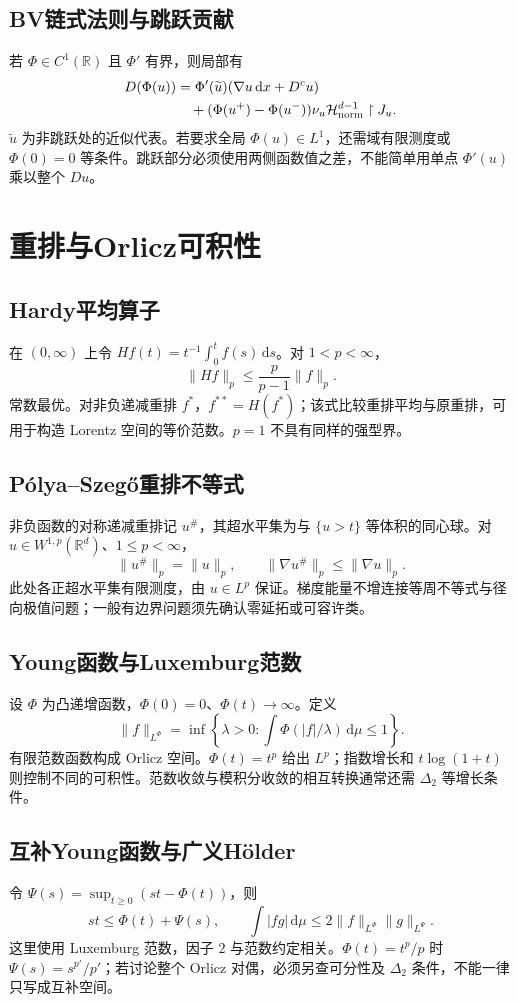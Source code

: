 \documentclass[../main.tex]{subfiles}
\begin{document}
\subsection{BV链式法则与跳跃贡献}
若 $\Phi\in C^1(\mathbb R)$ 且 $\Phi'$ 有界，则局部有
\begin{align*}
D(\Phi(u))&=\Phi'(\widetilde u)(\nabla u\,\mathrm dx+D^cu)\\
&\quad+(\Phi(u^+)-\Phi(u^-))\nu_u\mathcal H^{d-1}_{\rm norm}\restriction J_u.
\end{align*}
$\widetilde u$ 为非跳跃处的近似代表。若要求全局 $\Phi(u)\in L^1$，还需域有限测度或 $\Phi(0)=0$ 等条件。跳跃部分必须使用两侧函数值之差，不能简单用单点 $\Phi'(u)$ 乘以整个 $Du$。
\section{重排与Orlicz可积性}
\subsection{Hardy平均算子}
在 $(0,\infty)$ 上令 $Hf(t)=t^{-1}\int_0^tf(s)\,\mathrm ds$。对 $1<p<\infty$，
\[
\|Hf\|_p\le\frac p{p-1}\|f\|_p.
\]
常数最优。对非负递减重排 $f^*$，$f^{**}=H(f^*)$；该式比较重排平均与原重排，可用于构造 Lorentz 空间的等价范数。$p=1$ 不具有同样的强型界。
\subsection{Pólya--Szegő重排不等式}
非负函数的对称递减重排记 $u^\#$，其超水平集为与 $\{u>t\}$ 等体积的同心球。对 $u\in W^{1,p}(\mathbb R^d)$、$1\le p<\infty$，
\[
\|u^\#\|_p=\|u\|_p,\qquad\|\nabla u^\#\|_p\le\|\nabla u\|_p.
\]
此处各正超水平集有限测度，由 $u\in L^p$ 保证。梯度能量不增连接等周不等式与径向极值问题；一般有边界问题须先确认零延拓或可容许类。
\subsection{Young函数与Luxemburg范数}
设 $\Phi$ 为凸递增函数，$\Phi(0)=0$、$\Phi(t)\to\infty$。定义
\[
\|f\|_{L^\Phi}=\inf\left\{\lambda>0:\int\Phi(|f|/\lambda)\,\mathrm d\mu\le1\right\}.
\]
有限范数函数构成 Orlicz 空间。$\Phi(t)=t^p$ 给出 $L^p$；指数增长和 $t\log(1+t)$ 则控制不同的可积性。范数收敛与模积分收敛的相互转换通常还需 $\Delta_2$ 等增长条件。
\subsection{互补Young函数与广义Hölder}
令 $\Psi(s)=\sup_{t\ge0}(st-\Phi(t))$，则
\[
st\le\Phi(t)+\Psi(s),\qquad
\int|fg|\,\mathrm d\mu\le2\|f\|_{L^\Phi}\|g\|_{L^\Psi}.
\]
这里使用 Luxemburg 范数，因子 $2$ 与范数约定相关。$\Phi(t)=t^p/p$ 时 $\Psi(s)=s^{p'}/p'$；若讨论整个 Orlicz 对偶，必须另查可分性及 $\Delta_2$ 条件，不能一律只写成互补空间。
\end{document}
